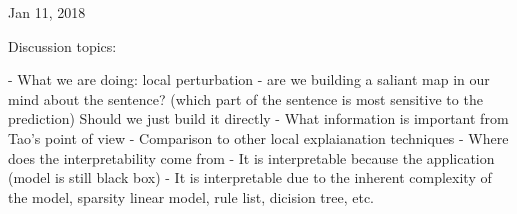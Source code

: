 
Jan 11, 2018

Discussion topics:

- What we are doing: local perturbation
- are we building a saliant map in our mind about the sentence?
  (which part of the sentence is most sensitive to the prediction)
  Should we just build it directly
- What information is important from Tao's point of view
- Comparison to other local explaianation techniques
- Where does the interpretability come from
    - It is interpretable because the application (model is still black box)
    - It is interpretable due to the inherent complexity of
      the model, sparsity linear model, rule list, dicision tree, etc. 
